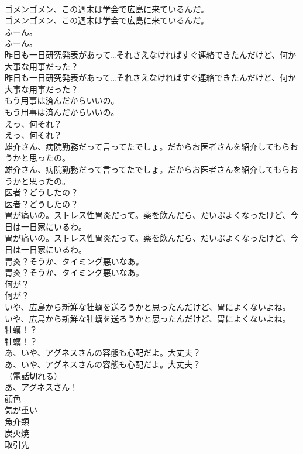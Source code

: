 \documentclass[8pt]{extreport}
\begin{document}
\begin{CJK}{UTF8}{min}
\\	ゴメンゴメン、この週末は学会で広島に来ているんだ。	
\\	ゴメンゴメン、この週末は学会で広島に来ているんだ。 
\\	ふーん。	
\\	ふーん。 
\\	昨日も一日研究発表があって…それさえなければすぐ連絡できたんだけど、何か大事な用事だった？	
\\	昨日も一日研究発表があって…それさえなければすぐ連絡できたんだけど、何か大事な用事だった？ 
\\	もう用事は済んだからいいの。	
\\	もう用事は済んだからいいの。 
\\	えっ、何それ？	
\\	えっ、何それ？ 
\\	雄介さん、病院勤務だって言ってたでしょ。だからお医者さんを紹介してもらおうかと思ったの。	
\\	雄介さん、病院勤務だって言ってたでしょ。だからお医者さんを紹介してもらおうかと思ったの。 
\\	医者？どうしたの？	
\\	医者？どうしたの？ 
\\	胃が痛いの。ストレス性胃炎だって。薬を飲んだら、だいぶよくなったけど、今日は一日家にいるわ。	
\\	胃が痛いの。ストレス性胃炎だって。薬を飲んだら、だいぶよくなったけど、今日は一日家にいるわ。 
\\	胃炎？そうか、タイミング悪いなあ。	
\\	胃炎？そうか、タイミング悪いなあ。 
\\	何が？	
\\	何が？ 
\\	いや、広島から新鮮な牡蠣を送ろうかと思ったんだけど、胃によくないよね。	
\\	いや、広島から新鮮な牡蠣を送ろうかと思ったんだけど、胃によくないよね。 
\\	牡蠣！？	
\\	牡蠣！？ 
\\	あ、いや、アグネスさんの容態も心配だよ。大丈夫？	
\\	あ、いや、アグネスさんの容態も心配だよ。大丈夫？ 
\\	（電話切れる）	
\\	あ、アグネスさん！ 
\\	顔色
\\	気が重い
\\	魚介類
\\	炭火焼
\\	取引先

\end{CJK}
\end{document}
